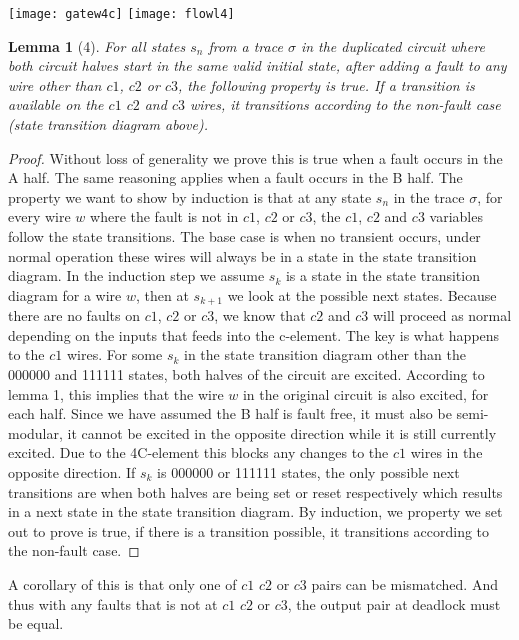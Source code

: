 \documentclass{article}
\newtheorem*{lemma}{Lemma}
\begin{document}
\texttt{[image: gatew4c]}
\texttt{[image: flowl4]}
\begin{lemma}[4]
For all states $s_n$ from a trace $\sigma$ in the duplicated circuit where both circuit halves start in the same valid initial state, after adding a fault to any wire other than $c1$, $c2$ or $c3$, the following property is true.  If a transition is available on the $c1$ $c2$ and $c3$ wires, it transitions according to the non-fault case (state transition diagram above).
\end{lemma}
\begin{proof}
Without loss of generality we prove this is true when a fault occurs in the A half.  The same reasoning applies when a fault occurs in the B half.  The property we want to show by induction is that at any state $s_n$ in the trace $\sigma$, for every wire $w$ where the fault is not in $c1$, $c2$ or $c3$, the $c1$, $c2$ and $c3$ variables follow the state transitions.  \newline
The base case is when no transient occurs, under normal operation these wires will always be in a state in the state transition diagram. \newline
In the induction step we assume $s_k$ is a state in the state transition diagram for a wire $w$, then at $s_{k+1}$ we look at the possible next states.  Because there are no faults on $c1$, $c2$ or $c3$, we know that $c2$ and $c3$ will proceed as normal depending on the inputs that feeds into the c-element.  The key is what happens to the $c1$ wires.  For some $s_k$ in the state transition diagram other than the 000000 and 111111 states, both halves of the circuit are excited.  According to lemma 1, this implies that the wire $w$ in the original circuit is also excited, for each half.  Since we have assumed the B half is fault free, it must also be semi-modular, it cannot be excited in the opposite direction while it is still currently excited.  Due to the 4C-element this blocks any changes to the $c1$ wires in the opposite direction.  If $s_k$ is 000000 or 111111 states, the only possible next transitions are when both halves are being set or reset respectively which results in a next state in the state transition diagram. 
\newline
By induction, we property we set out to prove is true, if there is a transition possible, it transitions according to the non-fault case.
\end{proof}
A corollary of this is that only one of $c1$ $c2$ or $c3$ pairs can be mismatched.  And thus with any faults that is not at $c1$ $c2$ or $c3$, the output pair at deadlock must be equal.
\end{document}

